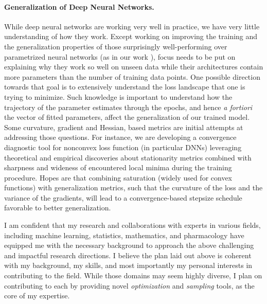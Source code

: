 \documentclass[twoside,11pt]{article}
\begin{document}
\vspace{0.08in}
\paragraph{Generalization of Deep Neural Networks.} 
While deep neural networks are working very well in practice, we have very little understanding of how they work. 
Except working on improving the training and the generalization properties of those surprisingly well-performing over parametrized neural networks (as in our work  \citep{zhou2020towards}), focus needs to be put on explaining why they work so well on unseen data while their architectures contain more parameters than the number of training data points. 
One possible direction towards that goal is to extensively understand the loss landscape that one is trying to minimize.
Such knowledge is important to understand how the trajectory of the parameter estimates through the epochs, and hence \emph{a fortiori} the vector of fitted parameters, affect the generalization of our trained model.
Some curvature, gradient and Hessian, based metrics are initial attempts at addressing those questions.
For instance, we are developing a convergence diagnostic tool for nonconvex loss function (in particular DNNs) leveraging theoretical and empirical discoveries about stationarity metrics combined with sharpness and wideness of encountered local minima during the training procedure.
Hopes are that combining saturation (widely used for convex functions) with generalization metrics, such that the curvature of the loss and the variance of the gradients, will lead to a convergence-based stepsize schedule favorable to better generalization.


\vspace{0.2in}
\textbf{} 
\vspace{0.2in}

I am confident that my research and collaborations with experts in various fields, including machine learning, statistics, mathematics, and pharmacology have equipped me with the necessary background to approach the above challenging and impactful research directions.
I believe the plan laid out above is coherent with my background, my skills, and most importantly my personal interests in contributing to the field.
While those domains may seem highly diverse, I plan on contributing to each by providing novel \emph{optimization} and \emph{sampling} tools, as the core of my expertise.





\newpage
\textbf{}
\vspace{-0.3in}


\end{document}
